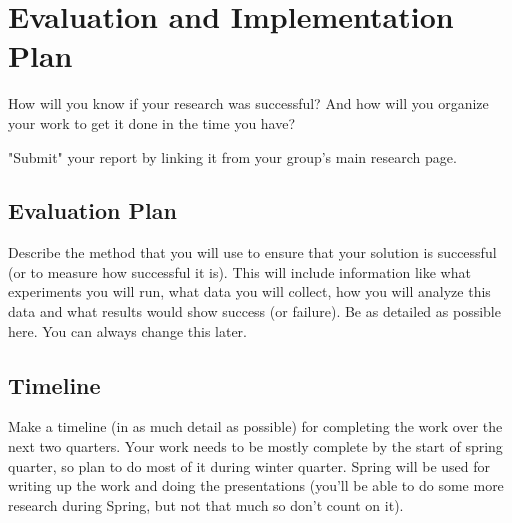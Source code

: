 \documentclass[12pt]{article}
\begin{document}
\section{Evaluation and Implementation Plan}
How will you know if your research was successful?  And how will you organize your work to get it done in the time you have?

"Submit" your report by linking it from your group's main research page.

\subsection{Evaluation Plan}
Describe the method that you will use to ensure that your solution is successful (or to measure how successful it is).  This will include information like what experiments you will run, what data you will collect, how you will analyze this data and what results would show success (or failure).  Be as detailed as possible here.  You can always change this later.

\subsection{Timeline}
Make a timeline (in as much detail as possible) for completing the work over the next two quarters.  Your work needs to be mostly complete by the start of spring quarter, so plan to do most of it during winter quarter.  Spring will be used for writing up the work and doing the presentations (you'll be able to do some more research during Spring, but not that much so don't count on it).



\end{document}
